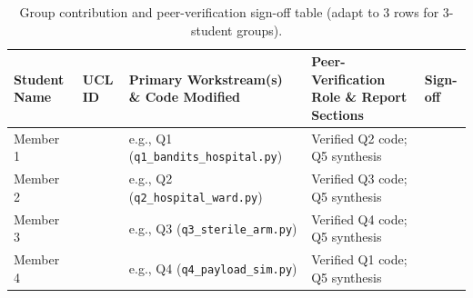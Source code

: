 \documentclass[11pt,a4paper]{article}
\begin{document}
\begin{table}[htbp]
    \centering
    \renewcommand{\arraystretch}{1.35}
    \begin{tabular}{@{} >{\raggedright\arraybackslash}p{2.4cm} >{\raggedright\arraybackslash}p{1.8cm} >{\raggedright\arraybackslash}p{4.8cm} >{\raggedright\arraybackslash}p{4.0cm} >{\raggedright\arraybackslash}p{1.5cm} @{}}
        \toprule
        \textbf{Student Name} & \textbf{UCL ID} & \textbf{Primary Workstream(s) \& Code Modified} & \textbf{Peer-Verification Role \& Report Sections} & \textbf{Sign-off} \\
        \midrule
        Member 1 & & e.g., Q1 (\texttt{q1\_bandits\_hospital.py}) & Verified Q2 code; Q5 synthesis & \\
        Member 2 & & e.g., Q2 (\texttt{q2\_hospital\_ward.py}) & Verified Q3 code; Q5 synthesis & \\
        Member 3 & & e.g., Q3 (\texttt{q3\_sterile\_arm.py}) & Verified Q4 code; Q5 synthesis & \\
        Member 4 & & e.g., Q4 (\texttt{q4\_payload\_sim.py}) & Verified Q1 code; Q5 synthesis & \\
        \bottomrule
    \end{tabular}
    \caption{Group contribution and peer-verification sign-off table (adapt to 3 rows for 3-student groups).}
\end{table}
\end{document}
